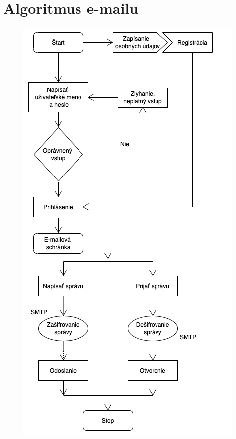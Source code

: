 \documentclass[10pt,slovak,twoside,a4paper]{article}
\begin{document}
\newpage

\section{Algoritmus e-mailu} 

\begin{figure}[h]
\centering
\begin{minipage}[b]{.40\textwidth}
\includegraphics[width=1\linewidth]{algoritmus.png}

\end{minipage}
\end{figure}
\end{document}
